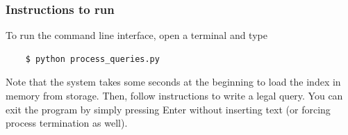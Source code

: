 \subsubsection{Instructions to run}

To run the command line interface, open a terminal and type
\begin{lstlisting}
	$ python process_queries.py
\end{lstlisting}
Note that the system takes some seconds at the beginning to load the index in memory from storage. Then, follow instructions to write a legal query. You can exit the program by simply pressing Enter without inserting text (or forcing process termination as well).
